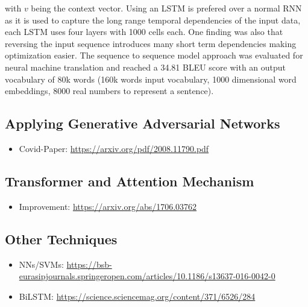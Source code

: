 with $v$ being the context vector. Using an \ac{LSTM} is prefered over a normal \ac{RNN} as it is used to capture the long range temporal dependencies of the input data, each \ac{LSTM} uses four layers with 1000 cells each. One finding was also that reversing the input sequence introduces many short term dependencies making optimization easier. The sequence to sequence model approach was evaluated for neural machine translation and reached a 34.81 BLEU score with an output vocabulary of 80k words (160k words input vocabulary, 1000 dimensional word embeddings, 8000 real numbers to represent a sentence). 


\subsection{Applying Generative Adversarial Networks} \label{fundamentalsF}

\begin{itemize}
	\item Covid-Paper: \url{https://arxiv.org/pdf/2008.11790.pdf}
\end{itemize}


\subsection{Transformer and Attention Mechanism} \label{fundamentalsG}

\begin{itemize}
	\item Improvement: \url{https://arxiv.org/abs/1706.03762}
\end{itemize}


\subsection{Other Techniques} \label{fundamentalsH}

\begin{itemize}
	\item NNs/SVMs: \url{https://bsb-eurasipjournals.springeropen.com/articles/10.1186/s13637-016-0042-0}
	\item BiLSTM: \url{https://science.sciencemag.org/content/371/6526/284}
\end{itemize}


\newpage
